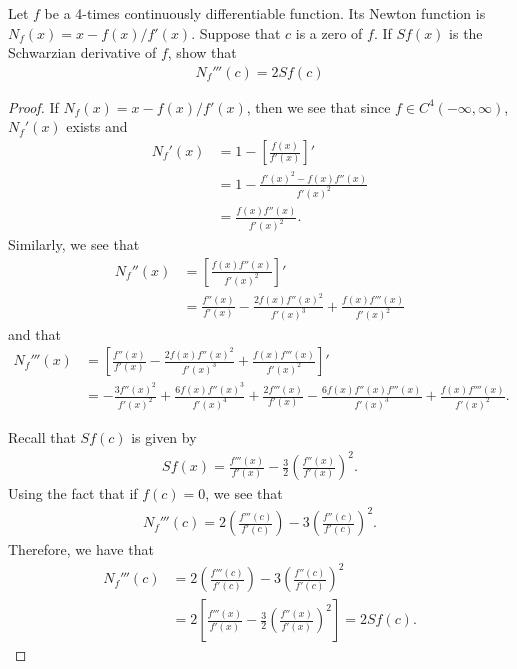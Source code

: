 \begin{problem}{4}
  Let $f$ be a 4-times continuously differentiable function. Its Newton
  function is $N_f(x) = x - f(x)/f'(x)$. Suppose that $c$ is a zero of $f$.
  If $Sf(x)$ is the Schwarzian derivative of $f$, show that
  \begin{align*}
    N_f'''(c) = 2Sf(c)
  \end{align*}
\end{problem}

\begin{proof}
  If $N_f(x) = x - f(x)/f'(x)$, then we see that since $f\in C^4(-\infty, \infty)$,
  $N_f'(x)$ exists and
  \begin{align*}
    N_f'(x) &= 1 - \left[\frac{f(x)}{f'(x)}\right]' \\
    &= 1 - \frac{f'(x)^2-f(x)f''(x)}{f'(x)^2} \\
    &= \frac{f(x)f''(x)}{f'(x)^2}.
  \end{align*}
  Similarly, we see that
  \begin{align*}
    N_f''(x) &= \left[\frac{f(x)f''(x)}{f'(x)^2}\right]' \\
    &= \frac{f''(x)}{f'(x)} - \frac{2f(x)f''(x)^2}{f'(x)^3} + \frac{f(x)f'''(x)}{f'(x)^2}
  \end{align*}
  and that
  \begin{align*}
    N_f'''(x) &= \left[\frac{f''(x)}{f'(x)} - \frac{2f(x)f''(x)^2}{f'(x)^3} + \frac{f(x)f'''(x)}{f'(x)^2}\right]'\\
    &= - \frac{3f''(x)^2}{f'(x)^2} + \frac{6f(x)f''(x)^3}{f'(x)^4} + \frac{2f'''(x)}{f'(x)} - \frac{6f(x)f''(x)f'''(x)}{f'(x)^3}+\frac{f(x)f''''(x)}{f'(x)^2}.
  \end{align*}

  Recall that $Sf(c)$ is given by
  \begin{align*}
    S f(x) = \frac{f'''(x)}{f'(x)} - \frac{3}{2}\left(\frac{f''(x)}{f'(x)}\right)^2.
  \end{align*}
  Using the fact that if $f(c) = 0$, we see that
  \begin{align*}
    N_f'''(c) = 2 \left(\frac{f'''(c)}{f'(c)}\right)-3\left(\frac{f''(c)}{f'(c)}\right)^2.
  \end{align*}
  Therefore, we have that
  \begin{align*}
    N_f'''(c) &= 2 \left(\frac{f'''(c)}{f'(c)}\right)-3\left(\frac{f''(c)}{f'(c)}\right)^2\\
    &= 2 \left[\frac{f'''(x)}{f'(x)} - \frac{3}{2}\left(\frac{f''(x)}{f'(x)}\right)^2\right] = 2 Sf(c).
  \end{align*}
\end{proof}
\newpage
